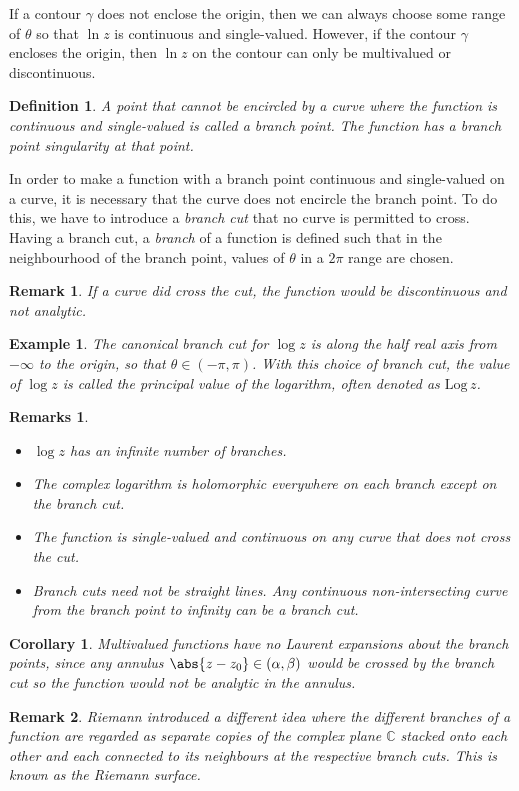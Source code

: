 \documentclass{article}
\theoremstyle{plain}\theoremheaderfont{\normalfont\itshape}\theorembodyfont{\rmfamily}\theoremseparator{.}\newtheorem*{rem}{Remark}\newtheorem*{ex}{Example}\newtheorem*{proof}{Proof}\newtheorem*{altp}{Alternative proof}
\theoremstyle{plain}\theoremheaderfont{\normalfont\bfseries}\theorembodyfont{\rmfamily}\theoremseparator{.}\newtheorem{thm}{Theorem}[section]\newtheorem{lem}[thm]{Lemma}\newtheorem{prop}[thm]{Proposition}\newtheorem*{cor}{Corollary}\newtheorem{defn}[thm]{Definition}\newtheorem{clm}[thm]{Claim}\newtheorem{clminproof}{Claim}
\theoremstyle{break}\theoremheaderfont{\normalfont\itshape}\theorembodyfont{\rmfamily}\theoremseparator{.\medskip}\newtheorem*{proofskip}{Proof}\newtheorem*{exs}{Examples}\newtheorem*{rems}{Remarks}
\theoremstyle{break}\theoremheaderfont{\normalfont\bfseries}\theorembodyfont{\rmfamily}\theoremseparator{.\medskip}\newtheorem{lemskip}[thm]{Lemma}\newtheorem{defnskip}[thm]{Definition}\newtheorem{propskip}[thm]{Proposition}\newtheorem{thmskip}[thm]{Theorem}
\numberwithin{equation}{section}
\begin{document}
	If a contour \(\gamma\) does not enclose the origin, then we can always choose some range of \(\theta\) so that \(\ln z\) is continuous and single-valued. However, if the contour \(\gamma\) encloses the origin, then \(\ln z\) on the contour can only be multivalued or discontinuous.
	\begin{defn}
		A point that cannot be encircled by a curve where the function is continuous and single-valued is called a \textit{branch point}. The function has a \textit{branch point singularity} at that point.
	\end{defn}
	In order to make a function with a branch point continuous and single-valued on a curve, it is necessary that the curve does not encircle the branch point. To do this, we have to introduce a \textit{branch cut} that no curve is permitted to cross. Having a branch cut, a \textit{branch} of a function is defined such that in the neighbourhood of the branch point, values of \(\theta\) in a \(2\pi\) range are chosen.
	\begin{rem}
		If a curve did cross the cut, the function would be discontinuous and not analytic.
	\end{rem}
	\begin{ex}
		The canonical branch cut for \(\log z\) is along the half real axis from \(-\infty\) to the origin, so that \(\theta\in(-\pi,\pi)\). With this choice of branch cut, the value of \(\log z\) is called the \textit{principal value} of the logarithm, often denoted as \(\mathrm{Log}\,z\).
	\end{ex}
	\begin{rems}
		\begin{itemize}[topsep=0pt]
			\item \(\log z\) has an infinite number of branches.
			\item The complex logarithm is holomorphic everywhere on each branch except on the branch cut.
			\item The function is single-valued and continuous on any curve that does not cross the cut.
			\item Branch cuts need not be straight lines. Any continuous non-intersecting curve from the branch point to infinity can be a branch cut.
		\end{itemize}
	\end{rems}
	
	\begin{cor}
		Multivalued functions have no Laurent expansions about the branch points, since any annulus \(\abs{z-z_0}\in(\alpha,\beta)\) would be crossed by the branch cut so the function would not be analytic in the annulus.
	\end{cor}
	\begin{rem}
		Riemann introduced a different idea where the different branches of a function are regarded as separate copies of the complex plane \(\mathbb{C}\) stacked onto each other and each connected to its neighbours at the respective branch cuts. This is known as the \textit{Riemann surface}.
	\end{rem}
\end{document}
